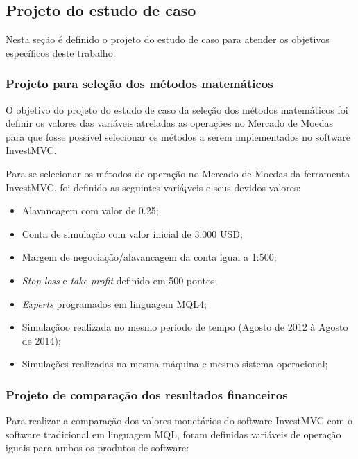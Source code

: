\subsection{Projeto do estudo de caso}
Nesta seção é definido o projeto do estudo de caso para atender os objetivos específicos deste trabalho.

\subsubsection{Projeto para seleção dos métodos matemáticos}
O objetivo do projeto do estudo de caso da seleção dos métodos matemáticos foi definir os valores das variáveis atreladas as operações no Mercado de Moedas para que fosse possível selecionar os métodos a serem implementados no software InvestMVC.

Para se selecionar os métodos de operação no Mercado de Moedas da ferramenta InvestMVC, foi definido as seguintes variá¡veis e seus devidos valores:

\begin{itemize}
\item Alavancagem com valor de 0.25;
\item Conta de simulação com valor inicial de 3.000 USD;
\item Margem de negociação/alavancagem da conta igual a 1:500;
\item \textit{Stop loss} e \textit{take profit} definido em 500 pontos;
\item\textit{Experts} programados em linguagem MQL4;
\item Simulaçãoo realizada no mesmo período de tempo (Agosto de 2012 à Agosto de 2014);
\item Simulações realizadas na mesma máquina e mesmo sistema operacional;
\end{itemize}

\subsubsection{Projeto de comparação dos resultados financeiros}

Para realizar a comparação dos valores monetários do software InvestMVC com o software tradicional em linguagem MQL, foram definidas variáveis de operação iguais para ambos os produtos de software:

